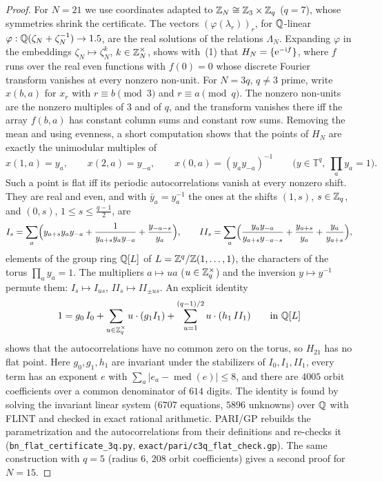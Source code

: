 \begin{proof}
For $N=21$ we use coordinates adapted to $\mathbb{Z}_N\cong\mathbb{Z}_3\times\mathbb{Z}_q$ ($q=7$), whose symmetries shrink the
certificate. The vectors
$(\varphi(\lambda_r))_r$, for $\mathbb{Q}$-linear $\varphi:\mathbb{Q}(\zeta_N+\zeta_N^{-1})\to1.5$, are the real solutions of the
relations $\Lambda_N$. Expanding $\varphi$ in the embeddings $\zeta_N\mapsto\zeta_N^k$, $k\in\mathbb{Z}_N^\times$, shows with~(1)
that $H_N=\{\mathrm{e}^{-\mathrm if}\}$, where $f$ runs over the real even functions with $f(0)=0$ whose discrete
Fourier transform vanishes at every nonzero non-unit. For $N=3q$, $q\ne3$ prime, write $x(b,a)$ for $x_r$ with
$r\equiv b\pmod3$ and $r\equiv a\pmod q$. The nonzero non-units are the nonzero multiples of $3$ and of $q$, and
the transform vanishes there iff the array $f(b,a)$ has constant column sums and constant row sums. Removing the
mean and using evenness, a short computation shows that the points of $H_N$ are exactly the unimodular multiples of
\[
  x(1,a)=y_a,\qquad x(2,a)=y_{-a},\qquad x(0,a)=(y_ay_{-a})^{-1}\qquad\bigl(y\in\mathbb T^q,\ \textstyle\prod_ay_a=1\bigr).
\]
Such a point is flat iff its periodic autocorrelations vanish at every nonzero shift. They are real and even, and with $\bar y_a=y_a^{-1}$
the ones at the shifts $(1,s)$, $s\in\mathbb{Z}_q$, and $(0,s)$, $1\le s\le\frac{q-1}2$, are
\[
  I_s=\sum_a\Bigl(y_{a+s}y_ay_{-a}+\frac1{y_{a+s}y_ay_{-a}}+\frac{y_{-a-s}}{y_a}\Bigr),\qquad
  II_s=\sum_a\Bigl(\frac{y_ay_{-a}}{y_{a+s}y_{-a-s}}+\frac{y_{a+s}}{y_a}+\frac{y_a}{y_{a+s}}\Bigr),
\]
elements of the group ring $\mathbb{Q}[L]$ of $L=\mathbb{Z}^q/\mathbb{Z}(1,\dots,1)$, the characters of the torus $\prod_ay_a=1$. The
multipliers $a\mapsto ua$ ($u\in\mathbb{Z}_q^\times$) and the inversion $y\mapsto y^{-1}$ permute them:
$I_s\mapsto I_{us}$, $II_s\mapsto II_{\pm us}$. An explicit identity
\[
  1=g_0\,I_0+\sum_{u\in\mathbb{Z}_q^\times}u\cdot(g_1I_1)+\sum_{u=1}^{(q-1)/2}u\cdot(h_1\,II_1)\qquad\text{in }\mathbb{Q}[L]
\]
shows that the autocorrelations have no common zero on the torus, so $H_{21}$ has no flat point. Here $g_0,g_1,h_1$
are invariant under the stabilizers of $I_0,I_1,II_1$, every term has an exponent $e$ with
$\sum_a|e_a-\operatorname{med}(e)|\le8$, and there are $4005$ orbit coefficients over a common denominator of $614$
digits. The identity is found by solving the invariant linear system ($6707$ equations, $5896$ unknowns) over $\mathbb{Q}$
with FLINT and checked in exact rational arithmetic. \textsc{PARI/GP} rebuilds the parametrization and the
autocorrelations from their definitions and re-checks it (\texttt{bn\_flat\_certificate\_3q.py},
\texttt{exact/pari/c3q\_flat\_check.gp}). The same construction with $q=5$ (radius $6$, $208$ orbit coefficients)
gives a second proof for $N=15$.


\end{proof}
